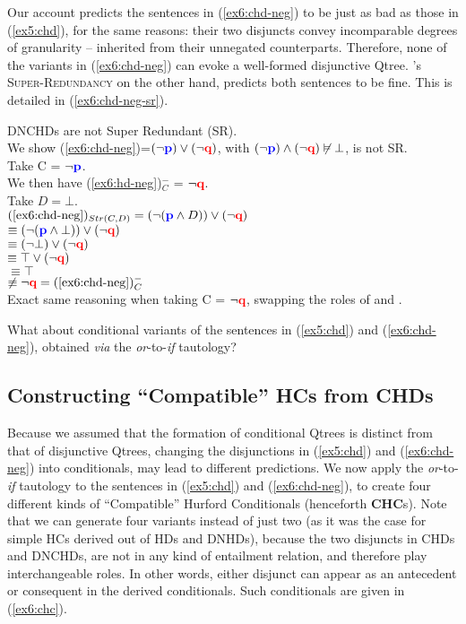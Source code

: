 Our account predicts the sentences in (\ref{ex6:chd-neg}) to be just as bad as those in (\ref{ex5:chd}), for the same reasons: their two disjuncts convey incomparable degrees of granularity -- inherited from their unnegated counterparts. Therefore, none of the variants in (\ref{ex6:chd-neg}) can evoke a well-formed disjunctive Qtree. \citeauthor{Kalomoiros2024}'s \textsc{Super-Redundancy} on the other hand, predicts both sentences to be fine. This is detailed in (\ref{ex6:chd-neg-sr}).

\begin{exe}
	\ex\label{ex6:chd-neg-sr} {DNCHDs are not Super Redundant (SR).\\
		We show (\ref{ex6:chd-neg})=$(\neg\textbf{\textcolor{blue}{p}})\vee(\neg\textbf{\textcolor{red}{q}})$, with $(\neg\textbf{\textcolor{blue}{p}}) \wedge (\neg\textbf{\textcolor{red}{q}}) \not\vDash \bot$, is not SR.\\
		Take C = $\neg\textbf{\textcolor{blue}{p}}$.\\
		We then have (\ref{ex6:hd-neg})$^-_C$ = $\neg\textbf{\textcolor{red}{q}}$.\\
		Take $D=\bot$.\\
		$(\textref{ex6:chd-neg})_{Str(C, D)} = (\neg(\p \wedge D)) \vee (\neg\q)$\\
		 $\equiv (\neg(\textbf{\textcolor{blue}{p}} \wedge \bot)) \vee (\neg\textbf{\textcolor{red}{q}})$\\
		 $\equiv (\neg\bot) \vee (\neg\textbf{\textcolor{red}{q}})$\\
		 $\equiv \top \vee (\neg\textbf{\textcolor{red}{q}})$\\
		 $\equiv \top$\\
		 $\not\equiv \neg\q = (\textref{ex6:chd-neg})^-_C$\\
		Exact same reasoning when taking C = $\neg\textbf{\textcolor{red}{q}}$, swapping the roles of \p{} and \q.
	}
\end{exe}

What about conditional variants of the sentences in (\ref{ex5:chd}) and (\ref{ex6:chd-neg}), obtained \textit{via} the \textit{or}-to-\textit{if} tautology?

\subsection{Constructing ``Compatible'' HCs from CHDs}

Because we assumed that the formation of conditional Qtrees is distinct from that of disjunctive Qtrees, changing the disjunctions in (\ref{ex5:chd}) and (\ref{ex6:chd-neg}) into conditionals, may lead to different predictions. We now apply the \textit{or}-to-\textit{if} tautology to the sentences in (\ref{ex5:chd}) and (\ref{ex6:chd-neg}), to create four different kinds of ``Compatible'' Hurford Conditionals (henceforth \textbf{CHC}s). Note that we can generate four variants instead of just two (as it was the case for simple HCs derived out of HDs and DNHDs), because the two disjuncts in CHDs and DNCHDs, are not in any kind of entailment relation, and therefore play interchangeable roles. In other words, either disjunct can appear as an antecedent or consequent in the derived conditionals. Such conditionals are given in (\ref{ex6:chc}).

